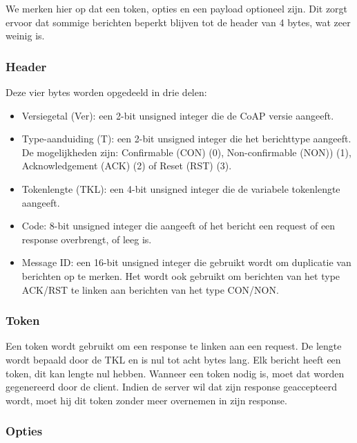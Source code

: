 We merken hier op dat een token, opties en een payload optioneel zijn. Dit zorgt ervoor dat sommige berichten beperkt blijven tot de header van 4 bytes, wat zeer weinig is.

\subsubsection{Header}

Deze vier bytes worden opgedeeld in drie delen:
\begin{itemize}
\item Versiegetal (Ver): een 2-bit unsigned integer die de CoAP versie aangeeft. 
\item Type-aanduiding (T): een 2-bit unsigned integer die het berichttype aangeeft. De mogelijkheden zijn: Confirmable (CON)  (0), Non-confirmable (NON))  (1), Acknowledgement (ACK)  (2) of Reset (RST)  (3).
\item Tokenlengte (TKL): een 4-bit unsigned integer die de variabele tokenlengte aangeeft.
\item Code: 8-bit unsigned integer die aangeeft of het bericht een request of een response overbrengt, of leeg is.
\item Message ID: een 16-bit unsigned integer die gebruikt wordt om duplicatie van berichten op te merken. Het wordt ook gebruikt om berichten van het type ACK/RST te linken aan berichten van het type CON/NON.
\end{itemize}

\subsubsection{Token}

Een token wordt gebruikt om een response te linken aan een request. De lengte wordt bepaald door de TKL en is nul tot acht bytes lang. Elk bericht heeft een token, dit kan lengte nul hebben. Wanneer een token nodig is, moet dat worden gegenereerd door de client. Indien de server wil dat zijn response geaccepteerd wordt, moet hij dit token zonder meer overnemen in zijn response.

\newpage

\subsubsection{Opties}

